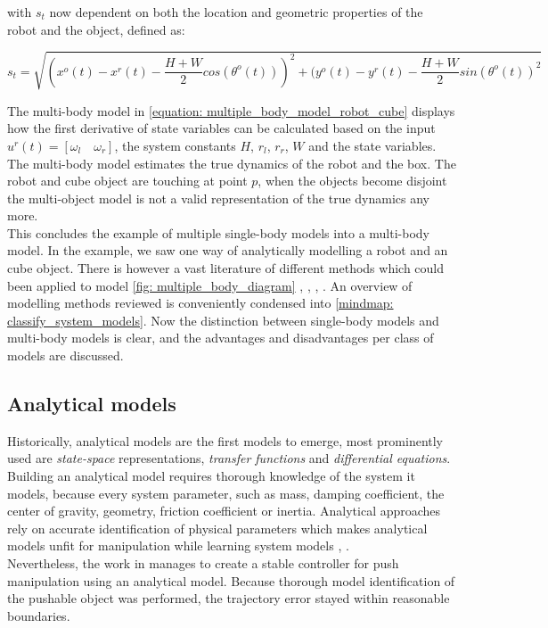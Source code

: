 with $s_t$ now dependent on both the location and geometric properties of the robot and the object, defined as:

$$
s_t = \sqrt{(x^o(t)-x^r(t)-\frac{H+W}{2}cos(\theta^o(t)))^2 + (y^o(t)-y^r(t)-\frac{H+W}{2}sin(\theta^o(t))^2}
$$

The multi-body model in \cref{equation: multiple_body_model_robot_cube} displays how the first derivative of state variables can be calculated based on the input $u^r(t) = \left[\omega_l \quad \omega_r \right]$, the system constants $H$, $r_l$, $r_r$, $W$ and the state variables. The multi-body model estimates the true dynamics of the robot and the box. The robot and cube object are touching at point $p$, when the objects become disjoint the multi-object model is not a valid representation of the true dynamics any more. \\

This concludes the example of multiple single-body models into a multi-body model. In the example, we saw one way of analytically modelling a robot and an cube object. There is however a vast literature of different methods which could been applied to model \cref{fig: multiple_body_diagram} \cite{nascimento_nonholonomic_2018}, \cite{bauza_dataefficient_2018}, \cite{stuber_featurebased_2018}, \cite{stuber_let_2020}. An overview of modelling methods reviewed is conveniently condensed into \cref{mindmap: classify_system_models}. Now the distinction between single-body models and multi-body models is clear, and the advantages and disadvantages per class of models are discussed.

\subsection{Analytical models}
\label{subsection: analytical_models}
Historically, analytical models are the first models to emerge, most prominently used are \textit{state-space} representations, \textit{transfer functions} and \textit{differential equations}. Building an analytical model requires thorough knowledge of the system it models, because every system parameter, such as mass, damping coefficient, the center of gravity, geometry, friction coefficient or inertia. Analytical approaches rely on accurate identification of physical parameters which makes analytical models unfit for manipulation while learning system models \cite{arruda_uncertainty_2017}, \cite{stuber_featurebased_2018}.\\

Nevertheless, the work in \cite{bauza_data-efficient_2018} manages to create a stable controller for push manipulation using an analytical model. Because thorough model identification of the pushable object was performed, the trajectory error stayed within reasonable boundaries. 

